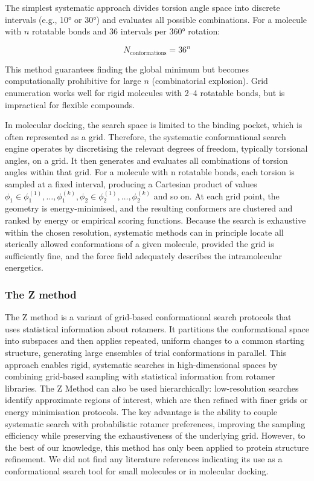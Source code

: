 \documentclass[12pt]{article}
\begin{document}
The simplest systematic approach divides torsion angle space into discrete intervals (e.g., 10° or 30°) and evaluates all possible combinations. For a molecule with $n$ rotatable bonds and 36 intervals per 360° rotation:


\begin{equation}
    N_{\text{conformations}} = 36^n
\label{eq:grid_enumeration}
\end{equation}

This method guarantees finding the global minimum but becomes computationally prohibitive for large $n$ (combinatorial explosion). Grid enumeration works well for rigid molecules with 2--4 rotatable bonds, but is impractical for flexible compounds.

In molecular docking, the search space is limited to the binding pocket, which is often represented as a grid. Therefore, the systematic conformational search engine operates by discretising the relevant degrees of freedom, typically torsional angles, on a grid.  It then generates and evaluates all combinations of torsion angles within that grid. For a molecule with n rotatable bonds, each torsion is sampled at a fixed interval, producing a Cartesian product of values  $\phi_1 \in {\phi_1^{(1)}, \dots, \phi_1^{(k)}}, \phi_2 \in {\phi_2^{(1)}, \dots, \phi_2^{(k)}}$ and so on. At each grid point, the geometry is energy-minimised, and the resulting conformers are clustered and ranked by energy or empirical scoring functions. Because the search is exhaustive within the chosen resolution, systematic methods can in principle locate all sterically allowed conformations of a given molecule, provided the grid is sufficiently fine, and the force field adequately describes the intramolecular energetics\cite{CH2_Ferreira2015}.

\subsubsection{The Z method}
The Z method\cite{CH2_Petrella2011} is a variant of grid-based conformational search protocols that uses statistical information about rotamers. It partitions the conformational space into subspaces and then applies repeated, uniform changes to a common starting structure, generating large ensembles of trial conformations in parallel. This approach enables rigid, systematic searches in high-dimensional spaces by combining grid-based sampling with statistical information from rotamer libraries. The Z Method can also be used hierarchically: low-resolution searches identify approximate regions of interest, which are then refined with finer grids or energy minimisation protocols. The key advantage is the ability to couple systematic search with probabilistic rotamer preferences, improving the sampling efficiency while preserving the exhaustiveness of the underlying grid. However, to the best of our knowledge, this method has only been applied to protein structure refinement. We did not find any literature references indicating its use as a conformational search tool for small molecules or in molecular docking.
\end{document}
